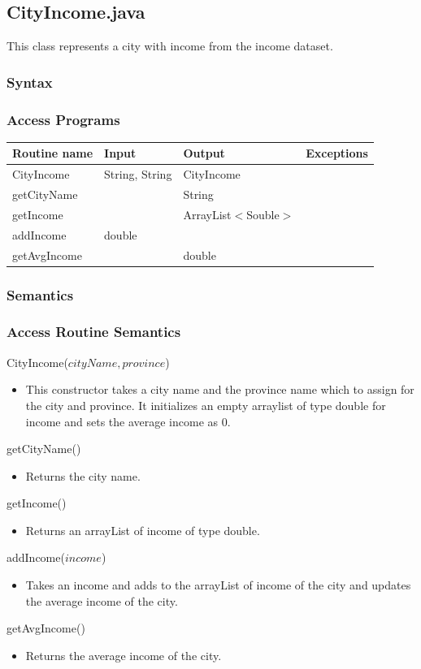 \documentclass[12pt,fleqn]{article}
\begin{document}
\subsection*{CityIncome.java}\label{cityincome}
This class represents a city with income from the income dataset.
\subsubsection* {Syntax}

\subsubsection* {Access Programs}
\begin{tabular}{| l | l | l | l |}
\hline
\textbf{Routine name} & \textbf{Input} & \textbf{Output} & \textbf{Exceptions}\\
\hline
CityIncome & String, String & CityIncome & ~\\
\hline
getCityName & ~ & String & ~\\
\hline
getIncome & ~ & ArrayList$<$Souble$>$ & ~\\
\hline
addIncome & double & ~ & ~\\
\hline
getAvgIncome & ~ & double & ~\\
\hline
\end{tabular}

\subsubsection*{Semantics}
\subsubsection*{Access Routine Semantics}
\noindent CityIncome($cityName, province$)
\begin{itemize}
\item This constructor takes a city name and the province name which to assign for the city and province. It
initializes an empty arraylist of type double for income and sets the average income as 0.
\end{itemize}
\noindent getCityName()
\begin{itemize}
\item Returns the city name.
\end{itemize}
\noindent getIncome()
\begin{itemize}
\item Returns an arrayList of income of type double.
\end{itemize}
\noindent addIncome($income$)
\begin{itemize}
\item Takes an income and adds to the arrayList of income of the city and updates the average income of the
city.
\end{itemize}
\noindent getAvgIncome()
\begin{itemize}
\item Returns the average income of the city.
\end{itemize}
\end{document}
